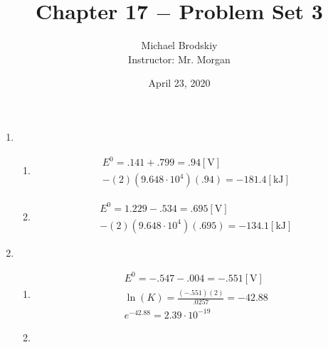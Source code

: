 \documentclass[12pt]{article}
\title{Chapter 17 $-$ Problem Set 3}
\date{April 23, 2020}
\author{Michael Brodskiy\\ \small Instructor: Mr. Morgan}
\begin{document}
\maketitle

\begin{enumerate}

  \item

    \begin{enumerate}

      \item 

        \begin{equation}
          \begin{split}
            E^0=.141+.799=.94[\si{\volt}]\\
            -(2)\left( 9.648\cdot10^{4} \right)\left( .94 \right)=-181.4[\si{\kilo\joule}]
          \end{split}
          \label{1}
        \end{equation}

      \item 

        \begin{equation}
          \begin{split}
            E^0=1.229-.534=.695[\si{\volt}]\\
            -(2)\left( 9.648\cdot10^{4} \right)\left( .695 \right)=-134.1[\si{\kilo\joule}]
          \end{split}
          \label{2}
        \end{equation}

    \end{enumerate}

  \item

    \begin{enumerate}

      \item 

        \begin{equation}
          \begin{split}
            E^0=-.547-.004=-.551[\si{\volt}]\\
            \ln(K)=\frac{(-.551)(2)}{.0257}=-42.88\\
            e^{-42.88}=2.39\cdot10^{-19}
          \end{split}
          \label{3}
        \end{equation}

      \item {}


\end{enumerate}
\end{enumerate}
\end{document}
